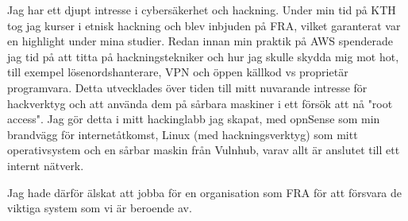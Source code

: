 \documentclass[../../main.tex]{subfiles}
\begin{document}
Jag har ett djupt intresse i cybersäkerhet och hackning. Under min tid på KTH tog jag kurser i etnisk hackning och blev inbjuden på FRA, vilket garanterat var en highlight under mina studier. Redan innan min praktik på AWS spenderade jag tid på att titta på hackningstekniker och hur jag skulle skydda mig mot hot, till exempel lösenordshanterare, VPN och öppen källkod vs proprietär programvara. Detta utvecklades över tiden till mitt nuvarande intresse för hackverktyg och att använda dem på sårbara maskiner i ett försök att nå "root access". Jag gör detta i mitt hackinglabb jag skapat, med opnSense som min brandvägg för internetåtkomst, Linux (med hackningsverktyg) som mitt operativsystem och en sårbar maskin från Vulnhub, varav allt är anslutet till ett internt nätverk. 

Jag hade därför älskat att jobba för en organisation som FRA för att försvara de viktiga system som vi är beroende av.
\\
\end{document}
